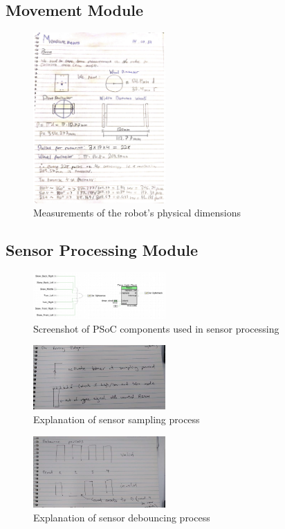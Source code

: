 \documentclass[conference]{IEEEtran}
\begin{document}
\subsection{Movement Module}

\begin{figure}[htbp]
	\centerline{\includegraphics[width=0.45\textwidth]{physical-measurements.png}}
	\caption{Measurements of the robot's physical dimensions}
	\label{fig:physical-dimensions}
\end{figure}

\subsection{Sensor Processing Module}

\begin{figure}[htbp]
	\centerline{\includegraphics[width=0.45\textwidth]{sensor-psoc.png}}
	\caption{Screenshot of PSoC components used in sensor processing}
	\label{fig:sensor-psoc}
\end{figure}

\begin{figure}[htbp]
	\centerline{\includegraphics[width=0.45\textwidth]{sensor-sampling.png}}
	\caption{Explanation of sensor sampling process}
	\label{fig:sensor-sampling}
\end{figure}
\begin{figure}[htbp]
	\centerline{\includegraphics[width=0.45\textwidth]{sensor-debouncing.png}}
	\caption{Explanation of sensor debouncing process}
	\label{fig:sensor-debouncing}
\end{figure}
\end{document}
